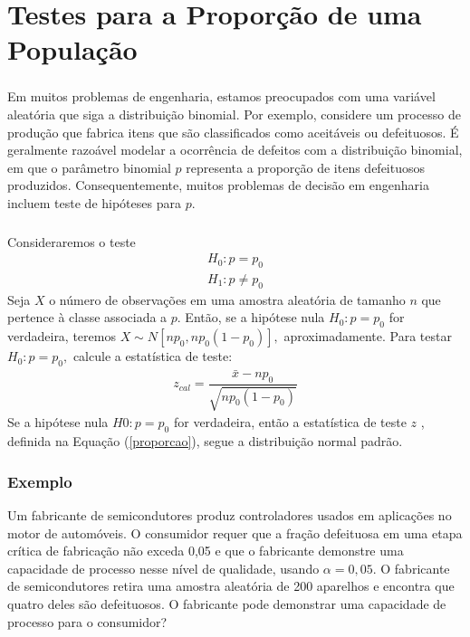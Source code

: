 \documentclass[14pt,aspectratio=1610]{beamer}
\newcommand{\bx}{\ensuremath{\bar{x}}}
\newcommand{\Ho}{\ensuremath{H_{0}}}
\begin{document}
\section{Testes para a Proporção de uma População}
\begin{frame}{}
\frametitle{}
\begin{block}{}
\justifying
Em muitos problemas de engenharia, estamos preocupados com uma variável aleatória que siga a distribuição binomial. Por exemplo, considere um processo de produção 
que fabrica itens que são classificados como aceitáveis ou defeituosos. É geralmente razoável modelar a ocorrência de defeitos com a distribuição binomial, em que o 
parâmetro binomial $p$ representa a proporção de itens defeituosos produzidos. Consequentemente, muitos problemas de decisão em engenharia incluem teste de 
hipóteses para $p.$
\end{block}
\end{frame}

\begin{frame}{}
\frametitle{}
\begin{block}{}
\justifying

Consideraremos o teste
\begin{align*}
H_{0}: p=p_{0}\\
H_{1}:p\neq p_{0}
\end{align*}
Seja $X$ o número de observações em uma amostra aleatória de tamanho $n$ que pertence 
à classe associada a $p.$ Então, se a hipótese nula $\Ho: p = p_{0}$ for verdadeira, teremos $X \sim N[np_{0}, np_{0}(1 - p_{0})],$ aproximadamente. Para testar 
$\Ho: p = p_{0},$ calcule a estatística de teste:
\begin{align}\label{proporcao}
z_{cal}=\dfrac{\bx-np_{0}}{\sqrt{np_{0}(1 - p_{0})}}
\end{align}
Se a hipótese nula $H0:p=p_{0}$ for verdadeira, então a estatística de teste $z$ , definida na Equação (\ref{proporcao}), segue a distribuição normal padrão.
\end{block}
\end{frame}

\begin{frame}{}
\frametitle{Exemplo}
\begin{block}{}
\justifying
Um fabricante de semicondutores produz controladores usados em aplicações no motor de automóveis. O consumidor requer que a fração de\-fei\-tuo\-sa em uma etapa crítica de fabricação não exceda 0,05 e que o fabricante demonstre uma capacidade de processo nesse nível de qualidade, usando $\alpha = 0,05.$ O fabricante de 
semicondutores retira uma amostra aleatória de 200 aparelhos e encontra que quatro deles são defeituosos. O fabricante pode demonstrar uma capacidade de processo 
para o consumidor?
\end{block}
\end{frame}
\end{document}
